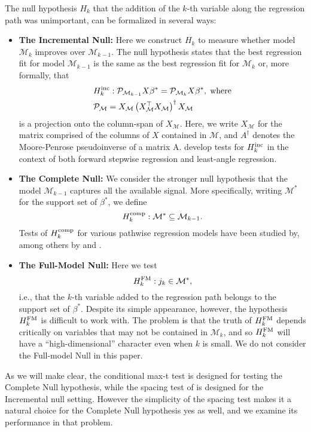 \documentclass{article}
\newcommand{\mm}{\mathcal{M}}
\newcommand{\pp}{\mathcal{P}}
\newcommand{\inc}{{\rm inc}}
\newcommand{\comp}{{\rm comp}}
\newcommand{\FM}{ {\rm FM}}
\begin{document}
The null hypothesis $H_k$ that the addition of the  $k$-th variable
along the regression path was unimportant, can be formalized
in several ways:
\begin{itemize}
\item {\bf The Incremental Null:} Here we construct $H_k$ to measure whether model $\mm_k$ improves over $\mm_{k-1}$.
The null hypothesis states that the best regression
fit for model $\mm_{k-1}$ is the same as the best regression fit for $\mm_k$ or,
more formally, that
\begin{align}
\label{eq:incremental}
&H_k^{\inc}: \pp_{\mm_{k - 1}} X \beta^* = 
\pp_{\mm_{k}} X \beta^*, \; \text{where} \\
&\pp_{\mm} = X_{\mm} \left(X_{\mm}^\top X_{\mm}\right)^{\dagger} X_{\mm}
\end{align}
is a projection onto the column-span of $X_\mm$. Here, we
write $X_{\mm}$ for the matrix comprised of the columns of $X$ contained
in $\mm$, and $A^\dagger$ denotes the Moore-Penrose pseudoinverse of 
a matrix A. \citet{TLTT2014} develop tests for $H_k^\inc$ in the context of
both forward stepwise regression and least-angle regression.
\item {\bf The Complete Null:}  We consider the stronger null hypothesis
that the model $\mm_{k - 1}$  captures all the available signal. More specifically,
writing $\mm^*$ for the support set of $\beta^*$, we define
\begin{equation}
\label{eq:complete}
H_k^\comp: \mm^* \subseteq \mm_{k - 1}.
\end{equation} 
Tests of $H_k^\comp$ for various pathwise regression models
have been studied by, among others by \citet{LTTT2013} and \cite{LT2014}.
\item {\bf The Full-Model Null:} Here we test
\begin{equation}
\label{eq:abs}
H_k^\FM: j_k \in \mm^*,
\end{equation}
i.e., that the $k$-th variable added to the regression path belongs to the support set of
$\beta^*$. Despite its simple appearance, however, the hypothesis $H_k^\FM$ is
difficult to work with. The problem is that the truth of $H_k^\FM$ depends critically on variables
that may not be contained in $\mm_k$, and so $H_k^\FM$ will have a ``high-dimensional''
character even when $k$ is small. We do not consider the
Full-model Null in this  paper.
\end{itemize}
As we will make clear, the conditional max-t test is designed for testing the Complete Null hypothesis,  while the spacing test of \citet{TLTT2014}
is designed for the Incremental null setting. However the simplicity of the spacing test makes it a natural choice for the Complete Null hypothesis yes as well,
and we examine its performance  in that problem.
\end{document}
